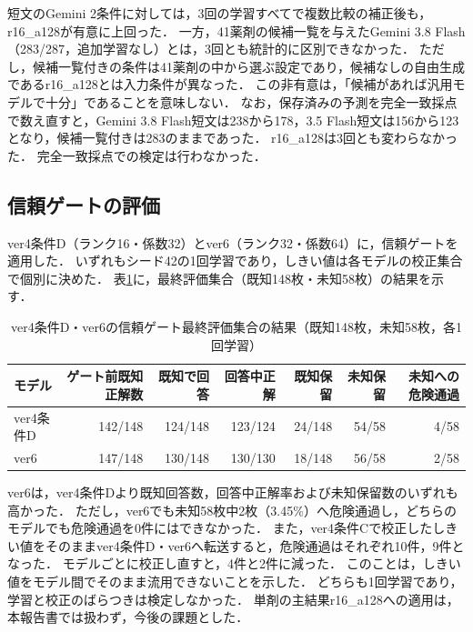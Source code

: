 \documentclass[uplatex,dvipdfmx]{jsarticle}
\begin{document}
短文のGemini 2条件に対しては，3回の学習すべてで複数比較の補正後も，r16\_a128が有意に上回った．
一方，41薬剤の候補一覧を与えたGemini 3.8 Flash（283/287，追加学習なし）とは，3回とも統計的に区別できなかった．
ただし，候補一覧付きの条件は41薬剤の中から選ぶ設定であり，候補なしの自由生成であるr16\_a128とは入力条件が異なった．
この非有意は，「候補があれば汎用モデルで十分」であることを意味しない．
なお，保存済みの予測を完全一致採点で数え直すと，Gemini 3.8 Flash短文は238から178，3.5 Flash短文は156から123となり，候補一覧付きは283のままであった．
r16\_a128は3回とも変わらなかった．
完全一致採点での検定は行わなかった．

\subsection{信頼ゲートの評価}\label{sec:trust_gate_results}

ver4条件D（ランク16・係数32）とver6（ランク32・係数64）に，信頼ゲートを適用した．
いずれもシード42の1回学習であり，しきい値は各モデルの校正集合で個別に決めた．
表\ref{tab:gate_d_ver6}に，最終評価集合（既知148枚・未知58枚）の結果を示す．

\begin{table}[htbp]
  \centering
  \caption{ver4条件D・ver6の信頼ゲート最終評価集合の結果（既知148枚，未知58枚，各1回学習）}
  \label{tab:gate_d_ver6}
  \small
  \setlength{\tabcolsep}{3.5pt}
  \begin{tabular}{|l|r|r|r|r|r|r|}
    \hline
    モデル & ゲート前既知正解数 & 既知で回答 & 回答中正解 & 既知保留 & 未知保留 & 未知への危険通過 \\ \hline
    ver4条件D & 142/148 & 124/148 & 123/124 & 24/148 & 54/58 & 4/58 \\ \hline
    ver6 & 147/148 & 130/148 & 130/130 & 18/148 & 56/58 & 2/58 \\ \hline
  \end{tabular}
\end{table}

ver6は，ver4条件Dより既知回答数，回答中正解率および未知保留数のいずれも高かった．
ただし，ver6でも未知58枚中2枚（3.45\%）へ危険通過し，どちらのモデルでも危険通過を0件にはできなかった．
また，ver4条件Cで校正したしきい値をそのままver4条件D・ver6へ転送すると，危険通過はそれぞれ10件，9件となった．
モデルごとに校正し直すと，4件と2件に減った．
このことは，しきい値をモデル間でそのまま流用できないことを示した．
どちらも1回学習であり，学習と校正のばらつきは検定しなかった．
単剤の主結果r16\_a128への適用は，本報告書では扱わず，今後の課題とした．
\end{document}
